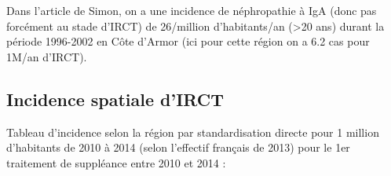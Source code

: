 \documentclass[11pt,a4paper]{article}\usepackage[]{graphicx}\usepackage[]{color}
\begin{document}
Dans l'article de Simon, on a une incidence de néphropathie à IgA (donc pas forcément au stade d'IRCT) de 26/million d'habitants/an (\textgreater 20 ans) durant la période 1996-2002 en Côte d'Armor (ici pour cette région on a 6.2 cas pour 1M/an d'IRCT). %

  \subsection{Incidence spatiale d'IRCT}

Tableau d'incidence selon la région par standardisation directe pour 1 million d'habitants de 2010 à 2014 (selon l'effectif français de 2013) pour le 1er traitement de suppléance entre 2010 et 2014 :
\end{document}
